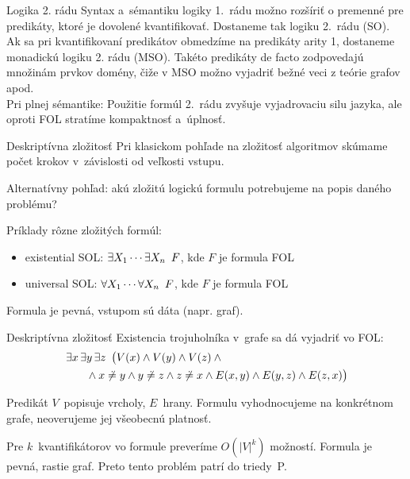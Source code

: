 \documentclass[12pt]{beamer}
\newcommand{\quant}[2]{\mathop{#1#2\/}\nolimits}
\newcommand{\A}{\quant\forall}
\newcommand{\E}{\quant\exists}
\begin{document}
\begin{frame}{Logika 2. rádu}
  Syntax a~sémantiku logiky 1.~rádu možno rozšíriť o premenné pre predikáty, ktoré je dovolené kvantifikovať.
  Dostaneme tak logiku 2.~rádu (SO).\\[3mm]

  Ak sa pri kvantifikovaní predikátov obmedzíme na predikáty arity 1, dostaneme monadickú logiku 2. rádu (MSO).
  Takéto predikáty de facto zodpovedajú množinám prvkov domény, čiže v MSO možno vyjadriť bežné veci z teórie grafov apod.\\[3mm]

  Pri plnej sémantike:
  \alert{Použitie formúl 2.~rádu zvyšuje vyjadrovaciu silu jazyka, ale oproti FOL stratíme kompaktnosť a~úplnosť}.
\end{frame}

\begin{frame}{Deskriptívna zložitosť}
  Pri klasickom pohľade na zložitosť algoritmov skúmame
  počet krokov v~závislosti od veľkosti vstupu.

  Alternatívny pohľad: akú zložitú logickú formulu potrebujeme
  na popis daného problému?

  Príklady rôzne zložitých formúl:
  \begin{itemize}
    \item existential SOL:\quad
      $\E{X_1}\cdots\E{X_n}\ F$, kde $F$ je formula FOL
    \item universal SOL:\quad
      $\A{X_1}\cdots\A{X_n}\ F$, kde $F$ je formula FOL
  \end{itemize}
  \alert{Formula je pevná, vstupom sú dáta (napr. graf).}
\end{frame}

\begin{frame}{Deskriptívna zložitosť}
  Existencia trojuholníka v~grafe sa dá vyjadriť vo FOL:
  \begin{align*}
    &\E x\E y\E z\ \big(V(x)\land V(y)\land V(z)\land {}\\
    &\qquad{}\land x\not\doteq y\land y\not\doteq z\land z\not\doteq x
      \land E(x,y)\land E(y,z)\land E(z,x)\big)
  \end{align*}

  Predikát $V$~popisuje vrcholy, $E$~hrany.
  Formulu vyhodnocujeme na konkrétnom grafe,
  neoverujeme jej všeobecnú platnosť.

  Pre $k$~kvantifikátorov vo formule preveríme $O(|V|^k)$ možností.
  \alert{Formula je pevná, rastie graf.}
  Preto tento problém patrí do triedy~P.
\end{frame}
\end{document}
